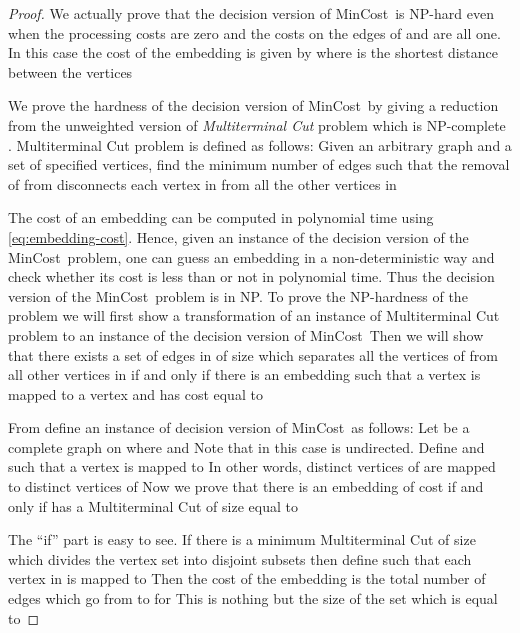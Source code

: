 \documentclass[journal]{IEEEtran}
\newcommand{\mincost}{\textsf{MinCost}}
\begin{document}
\begin{proof}
  We actually prove that the decision version of \mincost\ is NP-hard
  even when the processing costs are zero and the costs on the edges
  of  and  are all one. In this case the cost of the
  embedding  is given by 
  where  is the shortest distance between the vertices
  

  We prove the hardness of the decision version of \mincost\ by giving
  a reduction from the unweighted version of \textit{Multiterminal
    Cut} problem which is NP-complete \cite{Dahlhaus94}.
  Multiterminal Cut problem is defined as follows: Given an arbitrary
  graph  and
  a set  of 
  specified vertices, find the minimum number of edges  such that the removal of 
  from  disconnects each vertex in  from all
  the other vertices in 

  The cost of an embedding can be computed in polynomial time using
  \eqref{eq:embedding-cost}. Hence, given an instance of the decision
  version of the \mincost\ problem, one can guess an embedding in a
  non-deterministic way and check whether its cost is less than  or
  not in polynomial time. Thus the decision version of the \mincost\
  problem is in NP. To prove the NP-hardness of the problem we will
  first show a transformation of an instance of Multiterminal Cut
  problem  to an instance of the decision
  version of \mincost\  Then
  we will show that there exists a set of edges in  of
  size  which separates all the vertices of  from all other
  vertices in  if and only if there is an embedding 
  such that a vertex  is mapped to a vertex
   and has cost equal to 

  From  define an instance of decision version of \mincost\
   as follows: Let  be a complete graph on  where  and 
  Note that in this case  is undirected. Define
   and  such that a vertex 
  is mapped to  In other words,  distinct
  vertices of  are mapped to distinct vertices of
   Now we prove that there is an embedding  of
  cost  if and only if  has a Multiterminal Cut of size equal
  to 

  The ``if'' part is easy to see. If there is a minimum Multiterminal
  Cut  of size  which divides the vertex set
   into  disjoint subsets then define
   such that each vertex in  is
  mapped to  Then the cost of the embedding is the
  total number of edges which go from  to
   for  This is nothing but the size
  of the set  which is equal to 


\end{proof}
\end{document}
